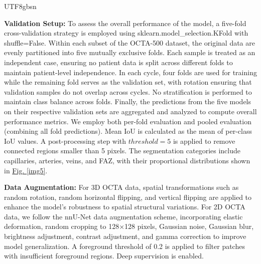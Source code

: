 \documentclass[times, review, 10pt]{elsarticle}
\begin{document}
\begin{CJK}{UTF8}{gbsn}
\par

\color{blue}
\textbf{Validation Setup:} To assess the overall performance of the model, a five-fold cross-validation strategy is employed using sklearn.model\_selection.KFold with shuffle=False. Within each subset of the OCTA-500 dataset, the original data are evenly partitioned into five mutually exclusive folds. Each sample is treated as an independent case, ensuring no patient data is split across different folds to maintain patient-level independence. In each cycle, four folds are used for training while the remaining fold serves as the validation set, with rotation ensuring that validation samples do not overlap across cycles. No stratification is performed to maintain class balance across folds. Finally, the predictions from the five models on their respective validation sets are aggregated and analyzed to compute overall performance metrics. We employ both per-fold evaluation and pooled evaluation (combining all fold predictions). Mean IoU is calculated as the mean of per-class IoU values. A post-processing step with $threshold=5$ is applied to remove connected regions smaller than 5 pixels. The segmentation categories include capillaries, arteries, veins, and FAZ, with their proportional distributions shown in \hyperref[img5]{Fig. \ref*{img5}}.
\par
\textbf{Data Augmentation:} For 3D OCTA data, spatial transformations such as random rotation, random horizontal flipping, and vertical flipping are applied to enhance the model's robustness to spatial structural variations. For 2D OCTA data, we follow the nnU-Net data augmentation scheme, incorporating elastic deformation, random cropping to 128×128 pixels, Gaussian noise, Gaussian blur, brightness adjustment, contrast adjustment, and gamma correction to improve model generalization. A foreground threshold of 0.2 is applied to filter patches with insufficient foreground regions. Deep supervision is enabled.

\end{CJK}
\end{document}
